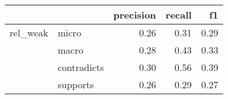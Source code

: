 \begin{tabular}{llrrr}
\toprule
         &          &  precision &  recall &   f1 \\
\midrule
rel\_weak & micro &       0.26 &    0.31 & 0.29 \\
         & macro &       0.28 &    0.43 & 0.33 \\
         & contradicts &       0.30 &    0.56 & 0.39 \\
         & supports &       0.26 &    0.29 & 0.27 \\
\bottomrule
\end{tabular}
